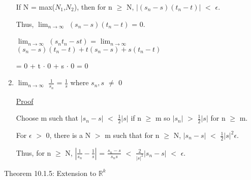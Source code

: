 \begin{enumerate}[label=(\alph*), leftmargin=2cm, itemsep=0.1cm]
                If N = max($N_1$,$N_2$), then for n $\geq$ N,
                $|(s_n - s)(t_n - t)|$ $<$ $\epsilon$.

                Thus, $\lim_{n \rightarrow \infty}$ 
                $(s_n - s)(t_n - t)$ = 0.

                \hspace{1cm}
                $\lim_{n \rightarrow \infty}$ $(s_n t_n - st)$
                = $\lim_{n \rightarrow \infty}$
                $(s_n - s)(t_n - t) + t(s_n - s) + s(t_n - t)$

                \hspace{4.4cm}
                = 0 + t $\cdot$ 0 + s $\cdot$ 0 = 0

        \item $\lim_{n \rightarrow \infty}$ $\frac{1}{s_n}$ = $\frac{1}{s}$
        where $s_n, s$ $\not =$ 0

            { \color{magenta} \underline{Proof} }

                Choose m such that $|s_n - s|$ $<$ $\frac{1}{2} |s|$ if n $\geq$ m
                so $|s_n|$ $>$ $\frac{1}{2} |s|$ for n $\geq$ m.

                For $\epsilon$ $>$ 0, there is a N $>$ m such that for n $\geq$ N, 
                $|s_n - s|$ $<$ $\frac{1}{2} |s|^2 \epsilon$.


                Thus, for n $\geq$ N, 
                $|\frac{1}{s_n} - \frac{1}{s}|$
                = $\frac{s_n - s}{s_n s}$
                $<$ $\frac{2}{|s|^2} |s_n - s|$
                $<$ $\epsilon$. \\
    \end{enumerate}

{ \color{red} Theorem 10.1.5: Extension to $\mathbb{R}^k$ }

